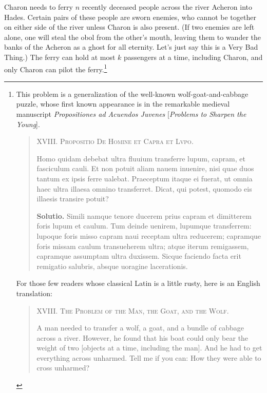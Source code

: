 \begin{exercises}
\item Charon needs to ferry $n$ recently deceased people across the river Acheron into Hades. Certain pairs of these people are sworn enemies, who cannot be together on either side of the river unless Charon is also present. (If two enemies are left alone, one will steal the obol from the other’s mouth, leaving them to wander the banks of the Acheron as a ghost for all eternity. Let’s just say this is a Very Bad Thing.) The ferry can hold at most $k$ passengers at a time, including Charon, and only Charon can pilot the ferry.\footnote{This problem is a generalization of the well-known wolf-goat-and-cabbage puzzle, whose first known appearance is in the remarkable medieval manuscript \textit{Propositiones ad Acuendos Juvenes} [\textit{Problems to Sharpen the Young}].
\begin{quote}
XVIII. \textsc{Propositio De Homine et Capra et Lvpo.}

Homo quidam debebat ultra fluuium transferre lupum, capram, et fasciculum cauli. Et non potuit aliam nauem inuenire, nisi quae duos tantum ex ipsis ferre ualebat. Praeceptum itaque ei fuerat, ut omnia haec ultra illaesa omnino transferret. Dicat, qui potest, quomodo eis illaesis transire potuit?

\textbf{Solutio.} Simili namque tenore ducerem prius capram et dimitterem foris lupum et caulum. Tum deinde uenirem, lupumque transferrem: lupoque foris misso capram naui receptam ultra reducerem; capramque foris missam caulum transueherem ultra; atque iterum remigassem, capramque assumptam ultra duxissem. Sicque faciendo facta erit remigatio salubris, absque uoragine lacerationis.
\end{quote}
For those few readers whose classical Latin is a little rusty, here is an English translation:
\begin{quote}
XVIII. \textsc{The Problem of the Man, the Goat, and the Wolf.}

A man needed to transfer a wolf, a goat, and a bundle of cabbage across a river. However, he found that his boat could only bear the weight of two [objects at a time, including the man]. And he had to get everything across unharmed. Tell me if you can: How they were able to cross unharmed?


\end{quote}}
\end{exercises}

